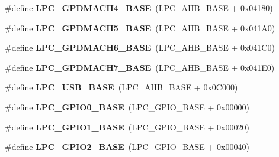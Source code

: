 \begin{DoxyCompactItemize}
\item 
\hypertarget{group___l_p_c17xx___system_ga7daad69ecd947ed94b48e29f2bdbfdaf}{\#define {\bfseries \-L\-P\-C\-\_\-\-G\-P\-D\-M\-A\-C\-H4\-\_\-\-B\-A\-S\-E}~(\-L\-P\-C\-\_\-\-A\-H\-B\-\_\-\-B\-A\-S\-E  + 0x04180)}\label{group___l_p_c17xx___system_ga7daad69ecd947ed94b48e29f2bdbfdaf}

\item 
\hypertarget{group___l_p_c17xx___system_ga20fdee18f2ce4126747d597f98eeb4c9}{\#define {\bfseries \-L\-P\-C\-\_\-\-G\-P\-D\-M\-A\-C\-H5\-\_\-\-B\-A\-S\-E}~(\-L\-P\-C\-\_\-\-A\-H\-B\-\_\-\-B\-A\-S\-E  + 0x041\-A0)}\label{group___l_p_c17xx___system_ga20fdee18f2ce4126747d597f98eeb4c9}

\item 
\hypertarget{group___l_p_c17xx___system_gab4f5fa13ccc2c91d5d9ef48916e6b34c}{\#define {\bfseries \-L\-P\-C\-\_\-\-G\-P\-D\-M\-A\-C\-H6\-\_\-\-B\-A\-S\-E}~(\-L\-P\-C\-\_\-\-A\-H\-B\-\_\-\-B\-A\-S\-E  + 0x041\-C0)}\label{group___l_p_c17xx___system_gab4f5fa13ccc2c91d5d9ef48916e6b34c}

\item 
\hypertarget{group___l_p_c17xx___system_gaf8515b7ffd05d964f79b0a287f861c9f}{\#define {\bfseries \-L\-P\-C\-\_\-\-G\-P\-D\-M\-A\-C\-H7\-\_\-\-B\-A\-S\-E}~(\-L\-P\-C\-\_\-\-A\-H\-B\-\_\-\-B\-A\-S\-E  + 0x041\-E0)}\label{group___l_p_c17xx___system_gaf8515b7ffd05d964f79b0a287f861c9f}

\item 
\hypertarget{group___l_p_c17xx___system_gaa619008881e9f76dc31131313eff1b79}{\#define {\bfseries \-L\-P\-C\-\_\-\-U\-S\-B\-\_\-\-B\-A\-S\-E}~(\-L\-P\-C\-\_\-\-A\-H\-B\-\_\-\-B\-A\-S\-E  + 0x0\-C000)}\label{group___l_p_c17xx___system_gaa619008881e9f76dc31131313eff1b79}

\item 
\hypertarget{group___l_p_c17xx___system_ga09e0e964ea1abf3b991772df2aa52405}{\#define {\bfseries \-L\-P\-C\-\_\-\-G\-P\-I\-O0\-\_\-\-B\-A\-S\-E}~(\-L\-P\-C\-\_\-\-G\-P\-I\-O\-\_\-\-B\-A\-S\-E + 0x00000)}\label{group___l_p_c17xx___system_ga09e0e964ea1abf3b991772df2aa52405}

\item 
\hypertarget{group___l_p_c17xx___system_ga9fb0536853721a3073bd69d94d0b7ec2}{\#define {\bfseries \-L\-P\-C\-\_\-\-G\-P\-I\-O1\-\_\-\-B\-A\-S\-E}~(\-L\-P\-C\-\_\-\-G\-P\-I\-O\-\_\-\-B\-A\-S\-E + 0x00020)}\label{group___l_p_c17xx___system_ga9fb0536853721a3073bd69d94d0b7ec2}

\item 
\hypertarget{group___l_p_c17xx___system_gae5524b2d728167194033ec7a1841a36b}{\#define {\bfseries \-L\-P\-C\-\_\-\-G\-P\-I\-O2\-\_\-\-B\-A\-S\-E}~(\-L\-P\-C\-\_\-\-G\-P\-I\-O\-\_\-\-B\-A\-S\-E + 0x00040)}\label{group___l_p_c17xx___system_gae5524b2d728167194033ec7a1841a36b}


\end{DoxyCompactItemize}
